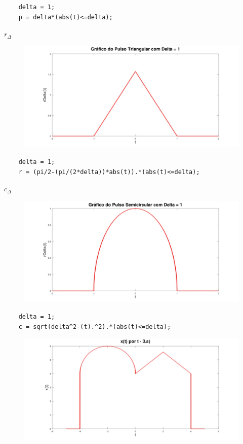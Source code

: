 \documentclass[10pt]{article}
\begin{document}
\begin{verbatim}
    delta = 1;
    p = delta*(abs(t)<=delta);
\end{verbatim}

$r_{\Delta}$

\begin{figure}[h]
    \includegraphics[scale=0.15]{questao3a2}
    \centering
\end{figure}

\begin{verbatim}
    delta = 1;
    r = (pi/2-(pi/(2*delta))*abs(t)).*(abs(t)<=delta);
\end{verbatim}

$c_{\Delta}$

\begin{figure}[h]
    \includegraphics[scale=0.15]{questao3a3}
    \centering
\end{figure}

\begin{verbatim}
    delta = 1;
    c = sqrt(delta^2-(t).^2).*(abs(t)<=delta);
\end{verbatim}

\begin{figure}[h]
    \includegraphics[scale=0.25]{questao3a}
    \centering
\end{figure}
\end{document}

